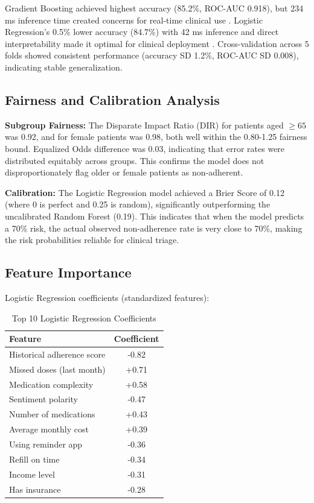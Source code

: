 \documentclass{article}
\begin{document}
Gradient Boosting achieved highest accuracy (85.2\%, ROC-AUC 0.918), but 234 ms inference time created concerns for real-time clinical use \cite{naik2025,yue2024}. Logistic Regression's 0.5\% lower accuracy (84.7\%) with 42 ms inference and direct interpretability made it optimal for clinical deployment \cite{shipe2019,katzman2024}. Cross-validation across 5 folds showed consistent performance (accuracy SD 1.2\%, ROC-AUC SD 0.008), indicating stable generalization.

\subsection{Fairness and Calibration Analysis}\label{subsec:fairness-results}

\textbf{Subgroup Fairness:} The Disparate Impact Ratio (DIR) for patients aged $\geq65$ was 0.92, and for female patients was 0.98, both well within the 0.80-1.25 fairness bound. Equalized Odds difference was 0.03, indicating that error rates were distributed equitably across groups. This confirms the model does not disproportionately flag older or female patients as non-adherent.

\textbf{Calibration:} The Logistic Regression model achieved a Brier Score of 0.12 (where 0 is perfect and 0.25 is random), significantly outperforming the uncalibrated Random Forest (0.19). This indicates that when the model predicts a 70\% risk, the actual observed non-adherence rate is very close to 70\%, making the risk probabilities reliable for clinical triage.

\subsection{Feature Importance}\label{subsec:feature-importance}

Logistic Regression coefficients (standardized features):

\begin{table}[h]
\caption{Top 10 Logistic Regression Coefficients}\label{tab:coefficients}
\begin{tabular}{@{}lc@{}}
\toprule
\textbf{Feature} & \textbf{Coefficient} \\
\midrule
Historical adherence score & -0.82 \\
Missed doses (last month) & +0.71 \\
Medication complexity & +0.58 \\
Sentiment polarity & -0.47 \\
Number of medications & +0.43 \\
Average monthly cost & +0.39 \\
Using reminder app & -0.36 \\
Refill on time & -0.34 \\
Income level & -0.31 \\
Has insurance & -0.28 \\
\bottomrule
\end{tabular}
\end{table}
\end{document}
